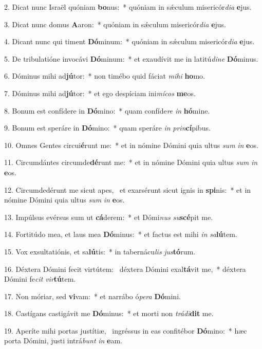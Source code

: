 2. Dicat nunc Israël quóniam \textbf{bo}nus:~*  quóniam in sǽculum misericór\textit{di}\textit{a} \textbf{e}jus.\

3. Dicat nunc domus \textbf{A}aron:~*  quóniam in sǽculum misericór\textit{di}\textit{a} \textbf{e}jus.\

4. Dicant nunc qui timent \textbf{Dó}minum:~*  quóniam in sǽculum misericór\textit{di}\textit{a} \textbf{e}jus.\

5. De tribulatióne invocávi \textbf{Dó}minum:~*  et exaudívit me in latitú\textit{di}\textit{ne} \textbf{Dó}minus.\

6. Dóminus mihi ad\textbf{jú}tor:~*  non timébo quid fáciat \textit{mi}\textit{hi} \textbf{ho}mo.\

7. Dóminus mihi ad\textbf{jú}tor:~*  et ego despíciam ini\textit{mí}\textit{cos} \textbf{me}os.\

8. Bonum est confídere in \textbf{Dó}mino:~*  quam confíde\textit{re} \textit{in} \textbf{hó}mine.\

9. Bonum est speráre in \textbf{Dó}mino:~*  quam speráre \textit{in} \textit{prin}\textbf{cí}pibus.\

10. Omnes Gentes circui\textbf{é}runt me:~*  et in nómine Dómini quia ultus \textit{sum} \textit{in} \textbf{e}os.\

11. Circumdántes circumde\textbf{dé}runt me:~*  et in nómine Dómini quia ultus \textit{sum} \textit{in} \textbf{e}os.\

12. Circumdedérunt me sicut apes, \dag\  et exarsérunt sicut ignis in \textbf{spi}nis:~*  et in nómine Dómini quia ultus \textit{sum} \textit{in} \textbf{e}os.\

13. Impúlsus evérsus sum ut \textbf{cá}derem:~*  et Dómi\textit{nus} \textit{su}\textbf{scé}pit me.\

14. Fortitúdo mea, et laus mea \textbf{Dó}minus:~*  et factus est mihi \textit{in} \textit{sa}\textbf{lú}tem.\

15. Vox exsultatiónis, et sa\textbf{lú}tis:~*  in tabernácu\textit{lis} \textit{jus}\textbf{tó}rum.\

16. Déxtera Dómini fecit virtútem: \dag\  déxtera Dómini exal\textbf{tá}vit me,~*  déxtera Dómini fe\textit{cit} \textit{vir}\textbf{tú}tem.\

17. Non móriar, sed \textbf{vi}vam:~*  et narrábo ó\textit{pe}\textit{ra} \textbf{Dó}mini.\

18. Castígans castigávit me \textbf{Dó}minus:~*  et morti non \textit{trá}\textit{di}\textbf{dit} me.\

19. Aperíte mihi portas justítiæ, \dag\  ingréssus in eas confitébor \textbf{Dó}mino:~*  hæc porta Dómini, justi intrá\textit{bunt} \textit{in} \textbf{e}am.\

